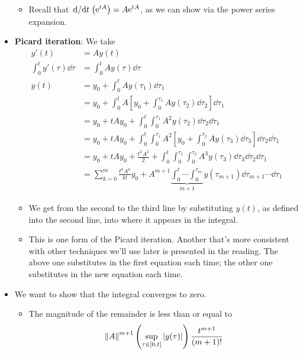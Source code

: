 \documentclass[../notes.tex]{subfiles}
\begin{document}
\begin{itemize}
    \begin{itemize}
        \item Recall that $\dv*{t}(\e[tA])=A\e[tA]$, as we can show via the power series expansion.
    \end{itemize}
    \item \textbf{Picard iteration}: We take
    \begingroup
    \allowdisplaybreaks
    \begin{align*}
        y'(t) &= Ay(t)\\
        \int_0^ty'(\tau)\dd{\tau} &= \int_0^tAy(\tau)\dd\tau\\
        y(t) &= y_0+\int_0^tAy(\tau_1)\dd\tau_1\\
        &= y_0+\int_0^tA\left[ y_0+\int_0^{\tau_1}Ay(\tau_2)\dd\tau_2 \right]\dd\tau_1\\
        &= y_0+tAy_0+\int_0^t\int_0^{\tau_1}A^2y(\tau_2)\dd\tau_2\dd\tau_1\\
        &= y_0+tAy_0+\int_0^t\int_0^{\tau_1}A^2\left[ y_0+\int_0^{\tau_2}Ay(\tau_3)\dd\tau_3 \right]\dd\tau_2\dd\tau_1\\
        &= y_0+tAy_0+\frac{t^2A^2}{2}+\int_0^t\int_0^{\tau_1}\int_0^{\tau_2}A^3y(\tau_3)\dd\tau_3\dd\tau_2\dd\tau_1\\
        &= \sum_{k=0}^m\frac{t^kA^k}{k!}y_0+A^{m+1}\underbrace{\int_0^t\cdots\int_0^{\tau_m}}_{m+1}y(\tau_{m+1})\dd\tau_{m+1}\cdots\dd\tau_1
    \end{align*}
    \endgroup
    \begin{itemize}
        \item We get from the second to the third line by substituting $y(t)$, as defined into the second line, into where it appears in the integral.
        \item This is one form of the Picard iteration. Another that's more consistent with other techniques we'll use later is presented in the reading. The above one substitutes in the first equation each time; the other one substitutes in the new equation each time.
    \end{itemize}
    \item We want to show that the integral converges to zero.
    \begin{itemize}
        \item The magnitude of the remainder is less than or equal to
        \begin{equation*}
            \norm{A}^{m+1}\left( \sup_{\tau\in[0,t]}|y(\tau)| \right)\frac{t^{m+1}}{(m+1)!}
        \end{equation*}
        \begin{itemize}

\end{itemize}
\end{itemize}
\end{itemize}
\end{document}

